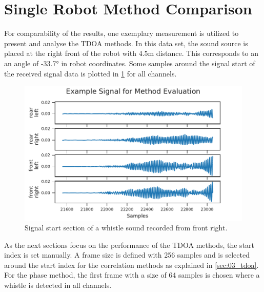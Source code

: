 \section{Single Robot Method Comparison}
\label{sec:04_tdoaSingle}

For comparability of the results, one exemplary measurement is utilized
to present and analyse the \ac{TDOA} methods.
In this data set, the sound source is placed at the right front
of the robot with 4.5\si{m} distance.
This corresponds to an an angle of -33.7\si{\degree} in robot coordinates.
Some samples around the signal start of the received signal data
is plotted in \cref{fig:04_tdoaSignal} for all channels.
\begin{figure}[ht]
	\centering
		\includegraphics[]{figures/evaluation/cc_frontRight_1_signal}
	\caption{Signal start section of a whistle sound recorded from front right.}
	\label{fig:04_tdoaSignal}
\end{figure}

As the next sections focus on the performance of the \ac{TDOA} methods,
the start index is set manually.
A frame size is defined with 256 samples and is selected around the start index for
the correlation methods as explained in \cref{sec:03_tdoa}.
For the phase method, the first frame with a size of 64 samples
is chosen where a whistle is detected in all channels.

